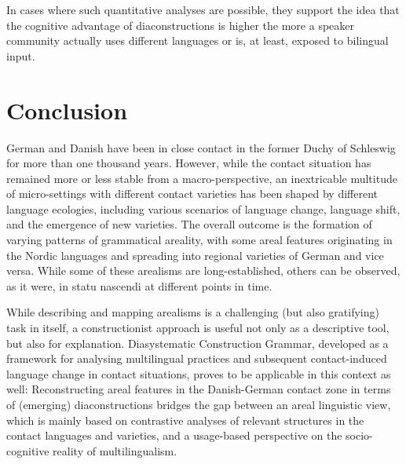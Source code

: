\documentclass[output=paper]{langsci/langscibook}
\begin{document}
In cases where such quantitative analyses are possible, they support  the idea that the cognitive advantage of diaconstructions is higher the more a speaker community actually uses different languages or is, at least, exposed to bilingual input.


\section{Conclusion}
 \label{sec:hoeder:5}


German and Danish have been in close contact in the former Duchy of Schleswig for more than one thousand years. However, while the contact situation has remained more or less stable from a macro-perspective, an inextricable multitude of micro-settings with different contact varieties has been shaped by different language ecologies, including various scenarios of language change, language shift, and the emergence of new varieties. The overall outcome is the formation of varying patterns of grammatical areality, with some areal features originating in the Nordic languages and spreading into regional varieties of German and vice versa. While some of these arealisms are long-established, others can be observed, as it were, in statu nascendi at different points in time.

While describing and mapping arealisms is a challenging (but also gratifying) task in itself, a constructionist approach is useful not only as a descriptive tool, but also for explanation. Diasystematic Construction Grammar, developed as a framework for analysing multilingual practices and subsequent contact-induced language change in contact situations, proves to be applicable in this context as well: Reconstructing areal features in the Danish-German contact zone in terms of (emerging) diaconstructions bridges the gap between an areal linguistic view, which is mainly based on contrastive analyses of relevant structures in the contact languages and varieties, and a usage-based perspective on the socio-cognitive reality of multilingualism.

{\sloppy\printbibliography[heading=subbibliography,notkeyword=this]}
\end{document}
